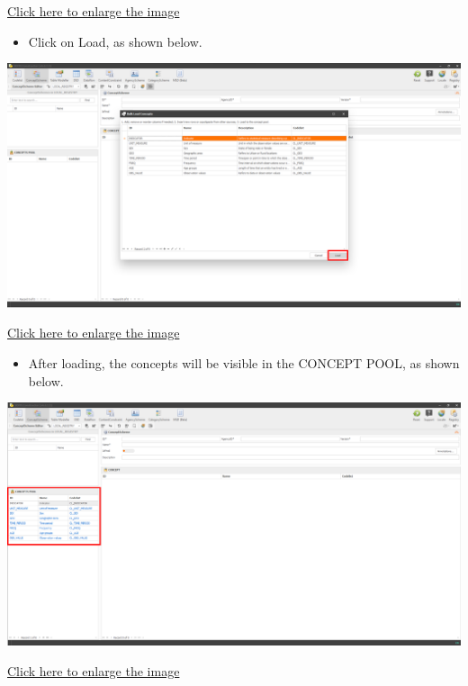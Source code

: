 \documentclass[
]{book}
\providecommand{\tightlist}{%
  \setlength{\itemsep}{0pt}\setlength{\parskip}{0pt}}
\begin{document}
\href{images/image108.png}{Click here to enlarge the image}

\begin{itemize}
\tightlist
\item
  Click on Load, as shown below.
\end{itemize}

\begin{center}\includegraphics[width=1\linewidth]{./images/image110} \end{center}

\href{images/image110.png}{Click here to enlarge the image}

\begin{itemize}
\tightlist
\item
  After loading, the concepts will be visible in the CONCEPT POOL, as shown below.
\end{itemize}

\begin{center}\includegraphics[width=1\linewidth]{./images/image112} \end{center}

\href{images/image112.png}{Click here to enlarge the image}
\end{document}
